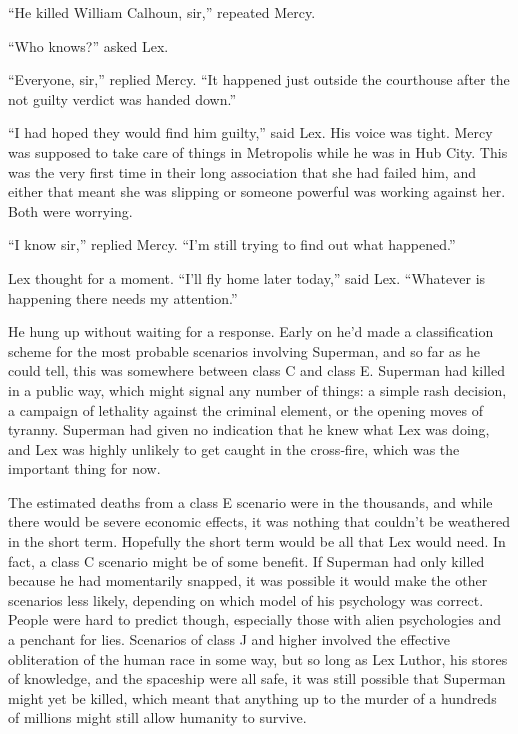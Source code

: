 \documentclass[ebook,12pt]{memoir}
\begin{document}
``He killed William Calhoun, sir,'' repeated Mercy.

``Who knows?'' asked Lex.

``Everyone, sir,'' replied Mercy. ``It happened just outside the
courthouse after the not guilty verdict was handed down.''

``I had hoped they would find him guilty,'' said Lex. His voice was
tight. Mercy was supposed to take care of things in Metropolis while he
was in Hub City. This was the very first time in their long association
that she had failed him, and either that meant she was slipping or
someone powerful was working against her. Both were worrying.

``I know sir,'' replied Mercy. ``I'm still trying to find out what
happened.''

Lex thought for a moment. ``I'll fly home later today,'' said Lex.
``Whatever is happening there needs my attention.''

He hung up without waiting for a response. Early on he'd made a
classification scheme for the most probable scenarios involving
Superman, and so far as he could tell, this was somewhere between class
C and class E. Superman had killed in a public way, which might signal
any number of things: a simple rash decision, a campaign of lethality
against the criminal element, or the opening moves of tyranny. Superman
had given no indication that he knew what Lex was doing, and Lex was
highly unlikely to get caught in the cross‐fire, which was the important
thing for now.

The estimated deaths from a class E scenario were in the thousands, and
while there would be severe economic effects, it was nothing that
couldn't be weathered in the short term. Hopefully the short term would
be all that Lex would need. In fact, a class C scenario might be of some
benefit. If Superman had only killed because he had momentarily snapped,
it was possible it would make the other scenarios less likely, depending
on which model of his psychology was correct. People were hard to
predict though, especially those with alien psychologies and a penchant
for lies. Scenarios of class J and higher involved the effective
obliteration of the human race in some way, but so long as Lex Luthor,
his stores of knowledge, and the spaceship were all safe, it was still
possible that Superman might yet be killed, which meant that anything up
to the murder of a hundreds of millions might still allow humanity to
survive.
\end{document}
